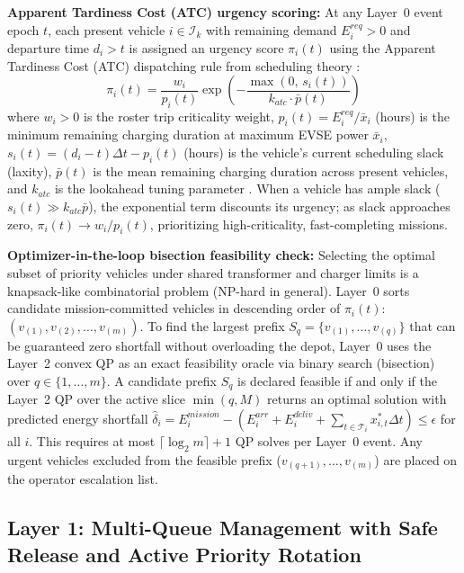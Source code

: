 \documentclass[final,3p,times,twocolumn]{elsarticle}
\begin{document}
\textbf{Apparent Tardiness Cost (ATC) urgency scoring:} At any Layer~0 event epoch $t$, each present vehicle $i \in \mathcal{I}_k$ with remaining demand $E_i^{req} > 0$ and departure time $d_i > t$ is assigned an urgency score $\pi_i(t)$ using the Apparent Tardiness Cost (ATC) dispatching rule from scheduling theory \cite{vepsalainen1987priority,valente2007heuris}:
\begin{equation}
    \pi_i(t) = \frac{w_i}{p_i(t)} \exp\left( -\frac{\max(0, \, s_i(t))}{k_{atc} \cdot \bar{p}(t)} \right)
    \label{eq:atc}
\end{equation}
where $w_i > 0$ is the roster trip criticality weight, $p_i(t) = E_i^{req} / \bar{x}_i$ (hours) is the minimum remaining charging duration at maximum EVSE power $\bar{x}_i$, $s_i(t) = (d_i - t)\Delta t - p_i(t)$ (hours) is the vehicle's current scheduling slack (laxity), $\bar{p}(t)$ is the mean remaining charging duration across present vehicles, and $k_{atc}$ is the lookahead tuning parameter \cite{valente2007heuris}. When a vehicle has ample slack ($s_i(t) \gg k_{atc}\bar{p}$), the exponential term discounts its urgency; as slack approaches zero, $\pi_i(t) \to w_i / p_i(t)$, prioritizing high-criticality, fast-completing missions.

\textbf{Optimizer-in-the-loop bisection feasibility check:} Selecting the optimal subset of priority vehicles under shared transformer and charger limits is a knapsack-like combinatorial problem (NP-hard in general). Layer~0 sorts candidate mission-committed vehicles in descending order of $\pi_i(t)$: $(v_{(1)}, v_{(2)}, \dots, v_{(m)})$. To find the largest prefix $S_q = \{v_{(1)}, \dots, v_{(q)}\}$ that can be guaranteed zero shortfall without overloading the depot, Layer~0 uses the Layer~2 convex QP as an exact feasibility oracle via binary search (bisection) over $q \in \{1, \dots, m\}$. A candidate prefix $S_q$ is declared feasible if and only if the Layer~2 QP over the active slice $\min(q, M)$ returns an optimal solution with predicted energy shortfall $\hat{\delta}_i = E_i^{mission} - (E_i^{arr} + E_i^{deliv} + \sum_{t \in \mathcal{T}_i} x_{i,t}^*\Delta t) \le \epsilon$ for all $i$. This requires at most $\lceil \log_2 m \rceil + 1$ QP solves per Layer~0 event. Any urgent vehicles excluded from the feasible prefix ($v_{(q+1)}, \dots, v_{(m)}$) are placed on the operator escalation list.

\subsection{Layer 1: Multi-Queue Management with Safe Release and Active Priority Rotation}
\label{sec:layer1}
\end{document}
